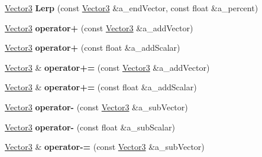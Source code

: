 \begin{DoxyCompactItemize}
\item 
\hypertarget{class_ai_math_1_1_vector3_a685ded691b745d6bcf8cf66569d16f42}{\hyperlink{class_ai_math_1_1_vector3}{Vector3} {\bfseries Lerp} (const \hyperlink{class_ai_math_1_1_vector3}{Vector3} \&a\+\_\+end\+Vector, const float \&a\+\_\+percent)}\label{class_ai_math_1_1_vector3_a685ded691b745d6bcf8cf66569d16f42}

\item 
\hypertarget{class_ai_math_1_1_vector3_a812b1578cb2b94528febeaad38a8d1d0}{\hyperlink{class_ai_math_1_1_vector3}{Vector3} {\bfseries operator+} (const \hyperlink{class_ai_math_1_1_vector3}{Vector3} \&a\+\_\+add\+Vector)}\label{class_ai_math_1_1_vector3_a812b1578cb2b94528febeaad38a8d1d0}

\item 
\hypertarget{class_ai_math_1_1_vector3_aaf79a5e9c561804295a7da87ade4b7b9}{\hyperlink{class_ai_math_1_1_vector3}{Vector3} {\bfseries operator+} (const float \&a\+\_\+add\+Scalar)}\label{class_ai_math_1_1_vector3_aaf79a5e9c561804295a7da87ade4b7b9}

\item 
\hypertarget{class_ai_math_1_1_vector3_a6b4708fcb32e2b271db459cc1e117610}{\hyperlink{class_ai_math_1_1_vector3}{Vector3} \& {\bfseries operator+=} (const \hyperlink{class_ai_math_1_1_vector3}{Vector3} \&a\+\_\+add\+Vector)}\label{class_ai_math_1_1_vector3_a6b4708fcb32e2b271db459cc1e117610}

\item 
\hypertarget{class_ai_math_1_1_vector3_a2fbc1c4b36c63d04d413b2c2843b6254}{\hyperlink{class_ai_math_1_1_vector3}{Vector3} \& {\bfseries operator+=} (const float \&a\+\_\+add\+Scalar)}\label{class_ai_math_1_1_vector3_a2fbc1c4b36c63d04d413b2c2843b6254}

\item 
\hypertarget{class_ai_math_1_1_vector3_a99787e65e5a1977b2f5e6ce075dd4e3d}{\hyperlink{class_ai_math_1_1_vector3}{Vector3} {\bfseries operator-\/} (const \hyperlink{class_ai_math_1_1_vector3}{Vector3} \&a\+\_\+sub\+Vector)}\label{class_ai_math_1_1_vector3_a99787e65e5a1977b2f5e6ce075dd4e3d}

\item 
\hypertarget{class_ai_math_1_1_vector3_a5a2ce34b772855a7146af1e4da9a4437}{\hyperlink{class_ai_math_1_1_vector3}{Vector3} {\bfseries operator-\/} (const float \&a\+\_\+sub\+Scalar)}\label{class_ai_math_1_1_vector3_a5a2ce34b772855a7146af1e4da9a4437}

\item 
\hypertarget{class_ai_math_1_1_vector3_a0190624324e757689ebee8ccc6265f8b}{\hyperlink{class_ai_math_1_1_vector3}{Vector3} \& {\bfseries operator-\/=} (const \hyperlink{class_ai_math_1_1_vector3}{Vector3} \&a\+\_\+sub\+Vector)}\label{class_ai_math_1_1_vector3_a0190624324e757689ebee8ccc6265f8b}


\end{DoxyCompactItemize}
